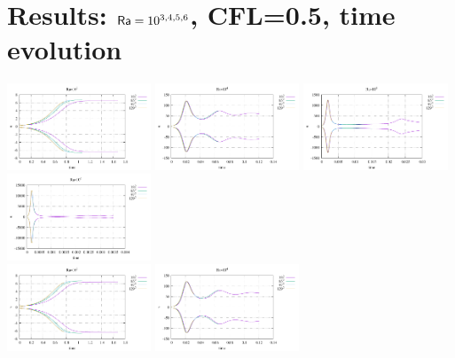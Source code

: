 \newpage
\section*{Results: ${\mathsf{Ra}}=10^{3,4,5,6}$, CFL=0.5, time evolution}

\begin{center}
\includegraphics[width=4.297cm]{python_codes/fieldstone_155/results/stats_u_Ra1e3}
\includegraphics[width=4.297cm]{python_codes/fieldstone_155/results/stats_u_Ra1e4}
\includegraphics[width=4.297cm]{python_codes/fieldstone_155/results/stats_u_Ra1e5}
\includegraphics[width=4.297cm]{python_codes/fieldstone_155/results/stats_u_Ra1e6}\\
\includegraphics[width=4.297cm]{python_codes/fieldstone_155/results/stats_v_Ra1e3}
\includegraphics[width=4.297cm]{python_codes/fieldstone_155/results/stats_v_Ra1e4}

\end{center}
